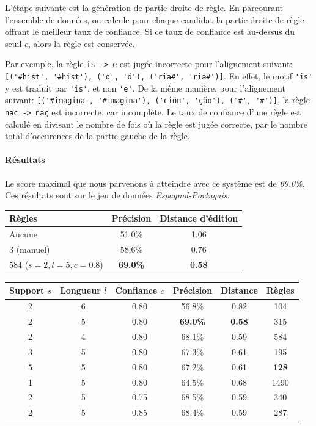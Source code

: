 \documentclass{article}
\begin{document}
L'étape suivante est la génération de partie droite de règle. En parcourant l'ensemble de données, on calcule pour chaque candidat la partie droite de règle offrant le meilleur taux de confiance. Si ce taux de confiance est au-dessus du seuil $c$, alors la règle est conservée.

Par exemple, la règle \verb|is -> e| est jugée incorrecte pour l'alignement suivant: \verb|[('#hist', '#hist'), ('o', 'ó'), ('ria#', 'ria#')]|. En effet, le motif \verb|'is'| y est traduit par \verb|'is'|, et non \verb|'e'|.
De la même manière, pour l'alignement suivant: \verb|[('#imagina', '#imagina'), ('ción', 'ção'), ('#', '#')]|, la règle \verb|nac -> naç| est incorrecte, car incomplète. Le taux de confiance d'une règle est calculé en divisant le nombre de fois où la règle est jugée correcte, par le nombre total d'occurences de la partie gauche de la règle.

\paragraph{Résultats}
Le score maximal que nous parvenons à atteindre avec ce système est de \emph{69.0\%}. Ces résultats sont sur le jeu de données \emph{Espagnol-Portugais}.
\begin{center}
\begin{tabular}{|l|c|c|}
\hline
Règles&Précision&Distance d'édition\\
\hline
Aucune&51.0\%&1.06\\
\hline
3 (manuel)&58.6\%&0.76\\
\hline
584 ($s=2, l=5, c=0.8$)&\textbf{69.0\%}&\textbf{0.58}\\
\hline
\end{tabular}
\end{center}

\begin{center}
\begin{tabular}{|c|c|c||c|c|c|}
\hline
Support $s$&Longueur $l$&Confiance $c$&Précision&Distance&Règles\\
\hline
2&6&0.80&56.8\%&0.82&104\\
\hline
2&5&0.80&\textbf{69.0\%}&\textbf{0.58}&315\\
\hline
2&4&0.80&68.1\%&0.59&584\\
\hline
\hline
3&5&0.80&67.3\%&0.61&195\\
\hline
5&5&0.80&67.2\%&0.61&\textbf{128}\\
\hline
1&5&0.80&64.5\%&0.68&1490\\
\hline
\hline
2&5&0.75&68.5\%&0.59&340\\
\hline
2&5&0.85&68.4\%&0.59&287\\
\hline
\end{tabular}
\end{center}
\end{document}
